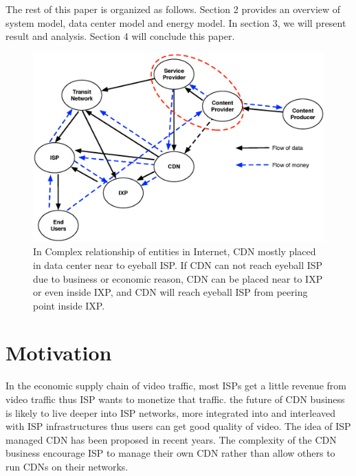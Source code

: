 \documentclass[JIP]{ipsj}
\begin{document}
The rest of this paper is organized as follows. Section 2 provides an overview of system model, data center model and energy model.  
In section 3, we will present result and analysis.  
Section 4 will conclude this paper. 

\begin{figure}[tb]
\begin{center}
\includegraphics[scale=0.4]{graphs/business-relationship.eps}
\end{center}
\caption{In Complex relationship of entities in Internet, 
CDN mostly placed in data center near to eyeball ISP. 
If CDN can not reach eyeball ISP due to business or economic reason, CDN can be placed near to IXP or even inside IXP, and CDN will reach eyeball ISP from peering point inside IXP.}
\label{fig:businessrelationship}
\vspace{-2mm}
\end{figure} 

\section{Motivation}\label{motivation}
In the economic supply chain of video traffic, most ISPs get a little revenue from video traffic thus ISP wants to monetize that traffic.
the future of CDN business is likely to live deeper into ISP networks, more integrated into and interleaved with ISP infrastructures thus users can get good quality of video.
The idea of ISP managed CDN has been proposed in recent years.
The complexity of the CDN business encourage ISP to manage their own CDN rather than allow others to run CDNs on their networks.
\end{document}

